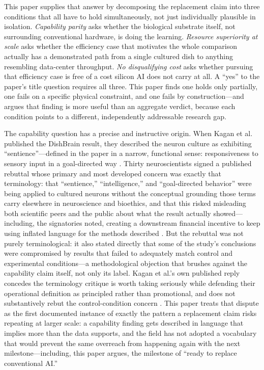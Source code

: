 \documentclass[journal]{IEEEtran}
\begin{document}
This paper supplies that answer by decomposing the replacement claim into three
conditions that all have to hold simultaneously, not just individually plausible in
isolation. \emph{Capability parity} asks whether the biological substrate itself,
not surrounding conventional hardware, is doing the learning. \emph{Resource
superiority at scale} asks whether the efficiency case that motivates the whole
comparison actually has a demonstrated path from a single cultured dish to
anything resembling data-center throughput. \emph{No disqualifying cost} asks
whether pursuing that efficiency case is free of a cost silicon AI does not carry at
all. A ``yes'' to the paper's title question requires all three. This paper finds one
holds only partially, one fails on a specific physical constraint, and one fails by
construction---and argues that finding is more useful than an aggregate verdict, because
each condition points to a different, independently addressable research gap.

The capability question has a precise and instructive origin. When Kagan et al.
published the DishBrain result, they described the neuron culture as exhibiting
``sentience''---defined in the paper in a narrow, functional sense: responsiveness to
sensory input in a goal-directed way \cite{kagan2022dishbrain}. Thirty neuroscientists
signed a published rebuttal whose primary and most developed concern was exactly that
terminology: that ``sentience,'' ``intelligence,'' and ``goal-directed behavior'' were
being applied to cultured neurons without the conceptual grounding those terms carry
elsewhere in neuroscience and bioethics, and that this risked misleading both
scientific peers and the public about what the result actually showed---including,
the signatories noted, creating a downstream financial incentive to keep using
inflated language for the methods described \cite{balci2023response}. But the
rebuttal was not purely terminological: it also stated directly that some of the
study's conclusions were compromised by results that failed to adequately match
control and experimental conditions---a methodological objection that brushes
against the capability claim itself, not only its label. Kagan et al.'s own published
reply concedes the terminology critique is worth taking seriously while defending
their operational definition as principled rather than promotional, and does not
substantively rebut the control-condition concern \cite{kagan2023reply}. This paper
treats that dispute as the first documented instance of exactly the pattern a
replacement claim risks repeating at larger scale: a capability finding gets
described in language that implies more than the data supports, and the field has
not adopted a vocabulary that would prevent the same overreach from happening again
with the next milestone---including, this paper argues, the milestone of ``ready to
replace conventional AI.''
\end{document}

